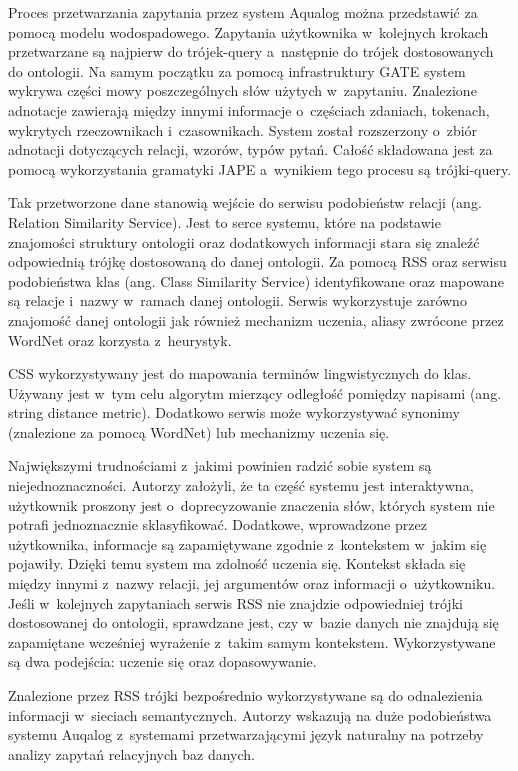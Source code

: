 Proces przetwarzania zapytania przez system Aqualog można przedstawić za pomocą modelu wodospadowego. Zapytania użytkownika w~kolejnych krokach przetwarzane są najpierw do trójek-query a~następnie do trójek dostosowanych do ontologii. Na samym początku za pomocą infrastruktury GATE system wykrywa części mowy poszczególnych słów użytych w~zapytaniu. Znalezione adnotacje zawierają między innymi informacje o~częściach zdaniach, tokenach, wykrytych rzeczownikach i~czasownikach. System został rozszerzony o~zbiór adnotacji dotyczących relacji, wzorów, typów pytań. Całość składowana jest za pomocą wykorzystania gramatyki JAPE a~wynikiem tego procesu są trójki-query.

Tak przetworzone dane stanowią wejście do serwisu podobieństw relacji (ang. Relation Similarity Service). Jest to serce systemu, które na podstawie znajomości struktury ontologii oraz dodatkowych informacji stara się znaleźć odpowiednią trójkę dostosowaną do danej ontologii. Za pomocą RSS oraz serwisu podobieństwa klas (ang. Class Similarity Service) identyfikowane oraz mapowane są relacje i~nazwy w~ramach danej ontologii. Serwis wykorzystuje zarówno znajomość danej ontologii jak również mechanizm uczenia, aliasy zwrócone przez WordNet oraz korzysta z~heurystyk.

CSS wykorzystywany jest do mapowania terminów lingwistycznych do klas. Używany jest w~tym celu algorytm mierzący odległość pomiędzy napisami (ang. string distance metric). Dodatkowo serwis może wykorzystywać synonimy (znalezione za pomocą WordNet) lub mechanizmy uczenia się. 

Największymi trudnościami z~jakimi powinien radzić sobie system są niejednoznaczności. Autorzy założyli, że ta część systemu jest interaktywna, użytkownik proszony jest o~doprecyzowanie znaczenia słów, których system nie potrafi jednoznacznie sklasyfikować. Dodatkowe, wprowadzone przez użytkownika, informacje są zapamiętywane zgodnie z~kontekstem w~jakim się pojawiły. Dzięki temu system ma zdolność uczenia się. Kontekst składa się między innymi z~nazwy relacji, jej argumentów oraz informacji o~użytkowniku. Jeśli w~kolejnych zapytaniach serwis RSS nie znajdzie odpowiedniej trójki dostosowanej do ontologii, sprawdzane jest, czy w~bazie danych nie znajdują się zapamiętane wcześniej wyrażenie z~takim samym kontekstem. Wykorzystywane są dwa podejścia: uczenie się oraz dopasowywanie.

Znalezione przez RSS trójki bezpośrednio wykorzystywane są do odnalezienia informacji w~sieciach semantycznych. Autorzy wskazują na duże podobieństwa systemu Auqalog z~systemami przetwarzającymi język naturalny na potrzeby analizy zapytań relacyjnych baz danych\cite{lopez2005aqualog}.

